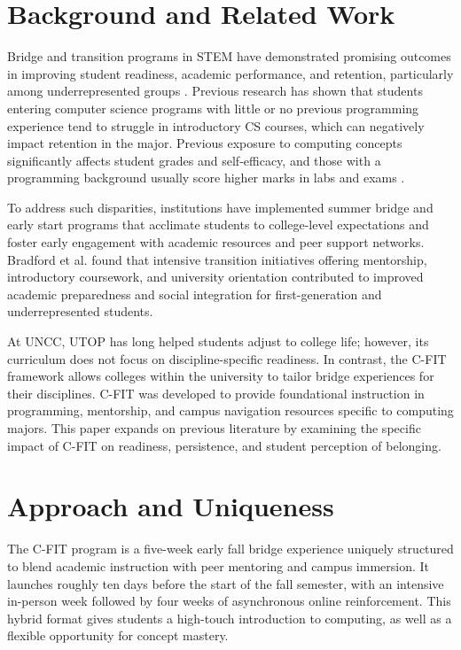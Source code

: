 \documentclass{article}
\begin{document}
\section{Background and Related Work}

Bridge and transition programs in STEM have demonstrated promising outcomes in improving student readiness, academic performance, and retention, particularly among underrepresented groups \cite{bradford2021}. Previous research \cite{kirkpatrick2017} has shown that students entering computer science programs with little or no previous programming experience tend to struggle in introductory CS courses, which can negatively impact retention in the major. Previous exposure to computing concepts significantly affects student grades and self-efficacy, and those with a programming background usually score higher marks in labs and exams \cite{kirkpatrick2017}.

To address such disparities, institutions have implemented summer bridge and early start programs that acclimate students to college-level expectations and foster early engagement with academic resources and peer support networks. Bradford et al. \cite{bradford2021} found that intensive transition initiatives offering mentorship, introductory coursework, and university orientation contributed to improved academic preparedness and social integration for first-generation and underrepresented students.

At UNCC, UTOP has long helped students adjust to college life; however, its curriculum does not focus on discipline-specific readiness. In contrast, the C-FIT framework allows colleges within the university to tailor bridge experiences for their disciplines. C-FIT was developed to provide foundational instruction in programming, mentorship, and campus navigation resources specific to computing majors. This paper expands on previous literature by examining the specific impact of C-FIT on readiness, persistence, and student perception of belonging.

\section{Approach and Uniqueness}

The C-FIT program is a five-week early fall bridge experience uniquely structured to blend academic instruction with peer mentoring and campus immersion. It launches roughly ten days before the start of the fall semester, with an intensive in-person week followed by four weeks of asynchronous online reinforcement. This hybrid format gives students a high-touch introduction to computing, as well as a flexible opportunity for concept mastery.
\end{document}
